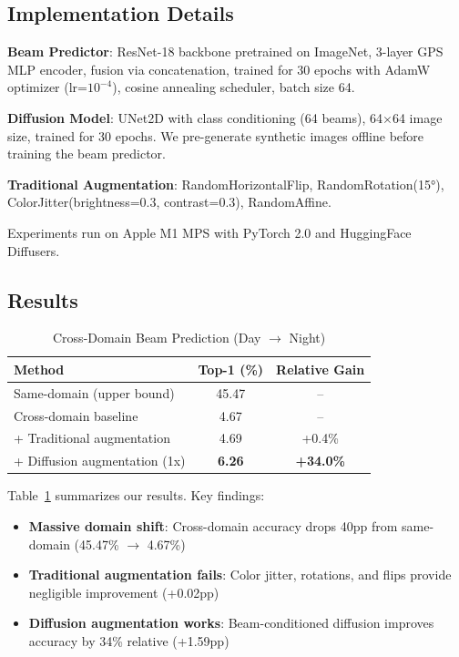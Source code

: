 \documentclass[conference]{IEEEtran}
\begin{document}
\subsection{Implementation Details}

\textbf{Beam Predictor}: ResNet-18 backbone pretrained on ImageNet, 3-layer GPS MLP encoder, fusion via concatenation, trained for 30 epochs with AdamW optimizer (lr=$10^{-4}$), cosine annealing scheduler, batch size 64.

\textbf{Diffusion Model}: UNet2D with class conditioning (64 beams), 64$\times$64 image size, trained for 30 epochs. We pre-generate synthetic images offline before training the beam predictor.

\textbf{Traditional Augmentation}: RandomHorizontalFlip, RandomRotation(15°), ColorJitter(brightness=0.3, contrast=0.3), RandomAffine.

Experiments run on Apple M1 MPS with PyTorch 2.0 and HuggingFace Diffusers.

\subsection{Results}

\begin{table}[t]
\centering
\caption{Cross-Domain Beam Prediction (Day $\to$ Night)}
\label{tab:results}
\begin{tabular}{lcc}
\toprule
Method & Top-1 (\%) & Relative Gain \\
\midrule
Same-domain (upper bound) & 45.47 & -- \\
\midrule
Cross-domain baseline & 4.67 & -- \\
+ Traditional augmentation & 4.69 & +0.4\% \\
+ Diffusion augmentation (1x) & \textbf{6.26} & \textbf{+34.0\%} \\
\bottomrule
\end{tabular}
\end{table}

Table~\ref{tab:results} summarizes our results. Key findings:

\begin{itemize}
    \item \textbf{Massive domain shift}: Cross-domain accuracy drops 40pp from same-domain (45.47\% $\to$ 4.67\%)
    \item \textbf{Traditional augmentation fails}: Color jitter, rotations, and flips provide negligible improvement (+0.02pp)
    \item \textbf{Diffusion augmentation works}: Beam-conditioned diffusion improves accuracy by 34\% relative (+1.59pp)
\end{itemize}
\end{document}
